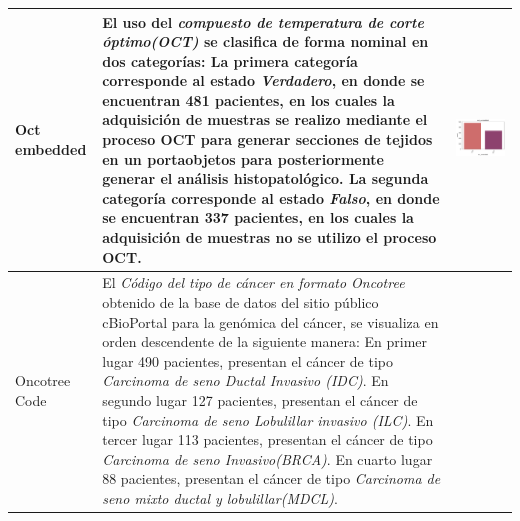 \begin{table}[!htb]
	\footnotesize
	\begin{threeparttable}
		\begin{tabular}{p{2.5cm} p{7cm} p{6.5cm}} \toprule
			
			Oct embedded
			& El uso del \textit{compuesto de temperatura de corte óptimo(OCT)} se clasifica de forma nominal en dos categorías: La primera categoría corresponde al estado \textit{Verdadero}, en donde se encuentran 481 pacientes, en los cuales la adquisición de muestras se realizo mediante el proceso OCT para generar secciones de tejidos en un portaobjetos para posteriormente generar el análisis histopatológico. La segunda categoría corresponde al estado \textit{Falso}, en donde se encuentran 337 pacientes, en los cuales la adquisición de muestras no se utilizo el proceso OCT.
			& \begin{center}\includegraphics[width=1\linewidth]{NOTEBOOK/IMAGENES_DESCRIPTIVAS/30_oct_embedded}\end{center}
			\\ \hline
			
			Oncotree Code
			& El \textit{Código del tipo de cáncer en formato Oncotree} obtenido de la base de datos del sitio público cBioPortal para la genómica del cáncer, se visualiza en orden descendente de la siguiente manera: En primer lugar 490 pacientes, presentan el cáncer de tipo \textit{Carcinoma de seno Ductal Invasivo (IDC)}. En segundo lugar 127 pacientes, presentan el cáncer de tipo \textit{Carcinoma de seno Lobulillar invasivo (ILC)}. En tercer lugar 113 pacientes, presentan el cáncer de tipo \textit{Carcinoma de seno Invasivo(BRCA)}. En cuarto lugar 88 pacientes, presentan el cáncer de tipo \textit{Carcinoma de seno mixto ductal y lobulillar(MDCL)}.
			

\end{tabular}
\end{threeparttable}
\end{table}
